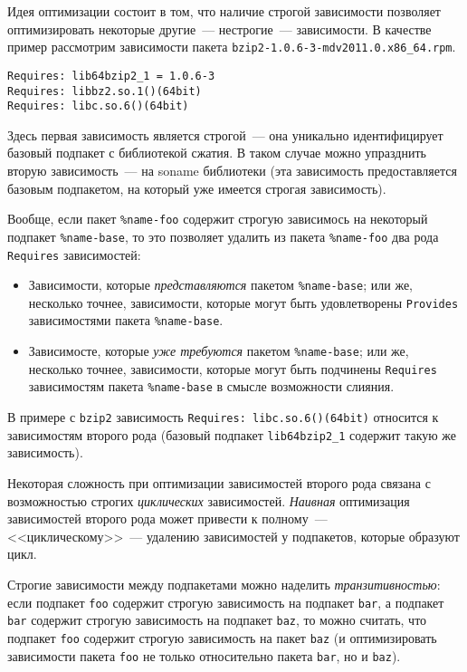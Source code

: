 \documentclass[russian,a4paper,12pt,titlepage]{article}
\begin{document}
Идея оптимизации состоит в том, что наличие строгой зависимости позволяет
оптимизировать некоторые другие~--- нестрогие~--- зависимости.  В качестве пример
рассмотрим зависимости пакета \verb|bzip2-1.0.6-3-mdv2011.0.x86_64.rpm|.
\begin{verbatim}
Requires: lib64bzip2_1 = 1.0.6-3
Requires: libbz2.so.1()(64bit)
Requires: libc.so.6()(64bit)
\end{verbatim}
Здесь первая зависимость является строгой~--- она уникально идентифицирует базовый подпакет с библиотекой сжатия.
В таком случае можно упразднить вторую зависимость~--- на soname библиотеки (эта зависимость предоставляется
базовым подпакетом, на который уже имеется строгая зависимость).

Вообще, если пакет \verb|%name-foo| содержит строгую зависимось на некоторый подпакет \verb|%name-base|,
то это позволяет удалить из пакета \verb|%name-foo| два рода \verb|Requires| зависимостей:
\begin{itemize}
\item Зависимости, которые \textit{представляются} пакетом \verb|%name-base|; или же, несколько точнее,
зависимости, которые могут быть удовлетворены \verb|Provides| зависимостями пакета \verb|%name-base|.
\item Зависимосте, которые \textit{уже требуются} пакетом \verb|%name-base|; или же, несколько точнее,
зависимости, которые могут быть подчинены \verb|Requires| зависимостям пакета \verb|%name-base|
в смысле возможности слияния.
\end{itemize}
В примере с \verb|bzip2| зависимость \verb|Requires: libc.so.6()(64bit)| относится к зависимостям второго рода
(базовый подпакет \verb|lib64bzip2_1| содержит такую же зависимость).

Некоторая сложность при оптимизации зависимостей второго рода связана с возможностью строгих \textit{циклических}
зависимостей.  \textit{Наивная} оптимизация зависимостей второго рода может привести к полному~--- <<циклическому>>~---
удалению зависимостей у подпакетов, которые образуют цикл.

Строгие зависимости между подпакетами можно наделить \textit{транзитивностью}: если подпакет \verb|foo| содержит
строгую зависимость на подпакет \verb|bar|, а подпакет \verb|bar| содержит строгую зависимость на подпакет \verb|baz|,
то можно считать, что подпакет \verb|foo| содержит строгую зависимость на пакет \verb|baz| (и оптимизировать зависимости
пакета \verb|foo| не только относительно пакета \verb|bar|, но и \verb|baz|).
\end{document}
